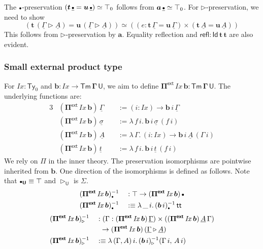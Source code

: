 \documentclass[12pt,a4paper,twoside,openany]{book}
\theoremstyle{remark}
\theoremstyle{definition}
\theoremstyle{theorem}
\newcommand{\mi}[1]{\mathit{#1}}
\newcommand{\bs}[1]{\boldsymbol{#1}}
\newcommand{\refl}{\mathsf{refl}}
\newcommand{\Tm}{\mathsf{Tm}}
\newcommand{\Ty}{\mathsf{Ty}}
\newcommand{\U}{\mathsf{U}}
\newcommand{\Id}{\mathsf{Id}}
\renewcommand{\tt}{\mathsf{tt}}
\newcommand{\ra}{\rightarrow}
\newcommand{\ext}{\triangleright}
\newcommand{\emptycon}{\scaleobj{.75}\bullet}
\newcommand{\Piinf}{\Pi^{\mathsf{ext}}}
\newcommand{\bPiinf}{\bs{\Piinf}}
\newcommand{\bTm}{\bs{\Tm}}
\newcommand{\bGamma}{\bs{\Gamma}}
\newcommand{\bt}{\bs{t}}
\newcommand{\bu}{\bs{u}}
\newcommand{\ba}{\bs{a}}
\newcommand{\bb}{\bs{b}}
\newcommand{\bU}{\bs{\U}}
\newcommand{\bId}{\bs{\Id}}
\newcommand{\ul}[1]{\underline{#1}}
\newcommand{\ulGamma}{\ul{\Gamma}}
\newcommand{\ulsigma}{\ul{\sigma}}
\newcommand{\ulemptycon}{\ul{\emptycon}}
\newcommand{\ult}{\ul{t}}
\newcommand{\ulA}{\ul{A}}
\newcommand{\defn}{:\equiv}
\begin{document}
The $\emptycon$-preservation $(\bt\,\ulemptycon = \bu\,\ulemptycon) \simeq
\top_0$ follows from $\ba\,\ulemptycon \simeq \top_0$. For $\ext$-preservation,
we need to show
\[
 (\bt\,(\ulGamma \ext \ulA) = \bu\,(\ulGamma \ext \ulA)) \simeq
 ((e : \bt\,\ulGamma = \bu\,\ulGamma) \times (\bt\,\ulA = \bu\,\ulA))
\]
This follows from $\ext$-preservation by $\ba$. Equality reflection and
$\bs{\refl :} \bId\,\bt\,\bt$ are also evident.

\subsubsection{Small external product type}

For $\mi{Ix} : \Ty_0$ and $\bb : \mi{Ix} \ra \bTm\,\bGamma\,\bU$, we aim to define
$\bPiinf\,\mi{Ix}\,\bb \bs{:} \bTm\,\bGamma\,\bU$. The underlying functions
are:
\begin{alignat*}{3}
  & (\bPiinf\,\mi{Ix}\,\bb)\,\ulGamma    &&:= (i : \mi{Ix})\ra \bb\,i\,\ulGamma\\
  & (\bPiinf\,\mi{Ix}\,\bb)\,\ulsigma    &&:= \lambda\,f\,i.\, \bb\,i\,\ulsigma\,(f\,i)\\
  & (\bPiinf\,\mi{Ix}\,\bb)\,\ulA\       &&:= \lambda\,\Gamma.\,(i : \mi{Ix})\ra \bb\,i\,\ulA\,(\Gamma\, i)\\
  & (\bPiinf\,\mi{Ix}\,\bb)\,\ult        &&:= \lambda\,f\,i.\, \bb\,i\,\ult\,(f\,i)
\end{alignat*}
We rely on $\Pi$ in the inner theory. The preservation isomorphisms are
pointwise inherited from $\bb$. One direction of the isomorphisms is defined as
follows. Note that $\emptycon_{\bU} \equiv \top$ and $\ext_{\bU}$ is $\Sigma$.
\begin{alignat*}{3}
  &(\bPiinf\,\mi{Ix}\,\bb)_{\emptycon}^{-1} && : \top\ra (\bPiinf\,\mi{Ix}\,\bb)\,\emptycon\\
  &(\bPiinf\,\mi{Ix}\,\bb)_{\emptycon}^{-1} && \defn \lambda\,\_\,i.\,(\bb\,i)_{\emptycon}^{-1}\,\tt
\end{alignat*}
\begin{alignat*}{3}
  &(\bPiinf\,\mi{Ix}\,\bb)_{\ext}^{-1} && : (\Gamma : (\bPiinf\,\mi{Ix}\,\bb)\,\ulGamma)\times((\bPiinf\,\mi{Ix}\,\bb)\,\ulA\,\Gamma)\\
  & && \hspace{0.5em}\ra (\bPiinf\,\mi{Ix}\,\bb)\,(\ulGamma \ext \ulA)\\
  & (\bPiinf\,\mi{Ix}\,\bb)_{\ext}^{-1} && \defn \lambda\,(\Gamma,A)\,i.\,(\bb\,i)_{\ext}^{-1}(\Gamma\,i,\,A\,i)
\end{alignat*}
\end{document}
